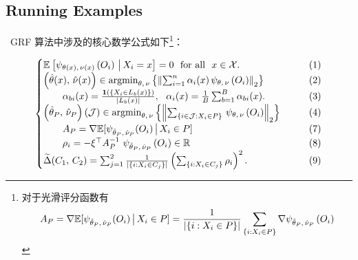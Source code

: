 \documentclass[aos]{imsart}
\theoremstyle{plain}
\theoremstyle{definition}
\theoremstyle{remark}
\begin{document}
\begin{CJK}{UTF8}{gbsn}




\section{Running Examples}

\, GRF 算法中涉及的核心数学公式如下\footnote{对于光滑评分函数有 $$A_P = \nabla \mathbb{E}[\psi_{\hat{\theta}_P, \, \hat{\nu}_P}(O_i) \,\big|\, X_i \in P] = \frac{1}{\left\lvert\left\{i : X_i \in P\right\}\right\rvert} \sum_{\left\{i : X_i \in P\right\}} \nabla \psi_{\hat{\theta}_P, \, \hat{\nu}_P}\left(O_i\right)$$ }：

\begin{equation*}
\begin{cases}
\EE{\psi_{\theta(x), \, \nu(x)}\p{O_i} \cond X_i = x} = 0 \ \text{ for all } \ x \in \xx. &\qquad (1) \\
\p{\htheta(x), \, \hnu(x)} \in \argmin_{\theta, \, \nu} \cb{\Norm{\sum_{i = 1}^n \alpha_i(x) \, \psi_{\theta, \, \nu}\p{O_i}}_2} &\qquad (2) \\
\qquad  \alpha_{bi}(x) = \frac{\1\p{\cb{X_i \in L_b(x)}}}{\abs{L_b(x)}}, \ \ \alpha_i(x) = \frac{1}{B} \sum_{b = 1}^B \alpha_{bi}(x).  &\qquad (3) \\
\p{\htheta_P, \, \hnu_P}(\mathcal{J}) \in \argmin_{\theta, \, \nu} \cb{\Norm{\sum_{\cb{i\in\mathcal{J} : X_i \in P}} \, \psi_{\theta, \, \nu}\p{O_i}}_2}   &\qquad (4) \\
\qquad A_P = \nabla \mathbb{E}[\psi_{\htheta_P, \, \hnu_P}(O_i) \cond X_i \in P]  &\qquad (7) \\
\qquad  \rho_i = -\xi^\top A_P^{-1} \ \psi_{\htheta_P, \, \hnu_P}\p{O_i} \in \RR &\qquad (8) \\
\tDelta(C_1, \, C_2) =  \sum_{j = 1}^2\frac{1}{\abs{\cb{i : X_i \in C_j}}}\p{ \sum_{\cb{i : X_i \in C_j}} \rho_i}^2. &\qquad (9)
\end{cases}
\end{equation*}



\end{CJK}
\end{document}
